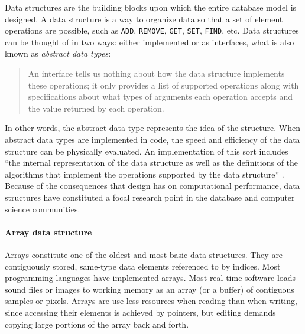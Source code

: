 Data structures are the building blocks upon which the entire database model is designed. A data structure is a way to organize data so that a set of element operations are possible, such as \texttt{ADD}, \texttt{REMOVE}, \texttt{GET}, \texttt{SET}, \texttt{FIND}, etc. Data structures can be thought of in two ways: either implemented or as interfaces, what is also known as \textit{abstract data types}:

\begin{quote}
	An interface tells us nothing about how the data structure implements these operations; it only provides a list of supported operations along with specifications about what types of arguments each operation accepts and the value returned by each operation. \parencite[18]{ods-cpp}
\end{quote}

In other words, the abstract data type represents the idea of the structure. When abstract data types are implemented in code, the speed and efficiency of the data structure can be physically evaluated. An implementation of this sort includes ``the internal representation of the data structure as well as the definitions of the algorithms that implement the operations supported by the data structure'' \parencite[18]{ods-cpp}. Because of the consequences that design has on computational performance, data structures have constituted a focal research point in the database and computer science communities.


\paragraph{Array data structure}
Arrays constitute one of the oldest and most basic data structures. They are contiguously stored, same-type data elements referenced to by indices. Most programming languages have implemented arrays. Most real-time software loads sound files or images to working memory as an array (or a buffer) of contiguous samples or pixels. Arrays are use less resources when reading than when writing, since accessing their elements is achieved by pointers, but editing demands copying large portions of the array back and forth.

